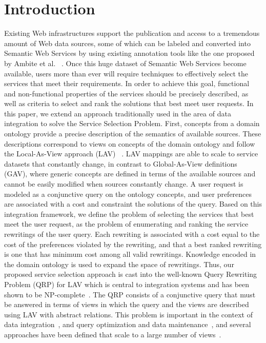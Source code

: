 \documentclass{llncs}
\begin{document}
\section{Introduction}
Existing Web infrastructures support the publication and access to a tremendous 
amount of Web data sources, some of which can be labeled and converted into 
Semantic Web Services by using existing annotation tools like the one proposed 
by Ambite et al. \ \cite{AmbiteISWC09}. Once this huge dataset of Semantic Web 
Services become available, users more than ever will require techniques to 
effectively select the services that meet their requirements. In order to achieve 
this goal, functional and non-functional properties of the services should be 
precisely described, as well as criteria to select and rank the solutions that best
 meet user requests.  
 In this paper, we extend an approach traditionally used in the area of data 
integration to solve the Service Selection Problem. First, concepts from a domain
ontology provide a precise description of the semantics of available sources. These 
descriptions correspond to views on concepts of the domain ontology and follow 
the Local-As-View approach (LAV)~\cite{levy:bucket} . LAV mappings are able to 
scale to service datasets that constantly change, in contrast to Global-As-View definitions 
(GAV), where generic concepts are defined in terms of the available sources and 
cannot be easily modified when sources constantly change. A user request is 
modeled as a conjunctive query on the ontology concepts, and user preferences 
are associated with a cost and constraint the solutions of the query. 
Based on this integration framework, we define the problem of selecting the 
services that best meet the user request, as the problem of enumerating and 
ranking the service rewritings of the user query. Each rewriting is associated 
with a cost equal to the cost of the preferences violated by the rewriting, and 
that a best ranked rewriting is one that has minimum cost among all valid 
rewritings. Knowledge encoded in the domain ontology is used to expand the 
space of rewritings. Thus, our proposed service selection approach is cast into 
the well-known Query Rewriting Problem (QRP) for LAV which is central to 
integration systems and has been shown to be NP-complete~\cite{Ullman00}. 
The QRP consists of a conjunctive query that must be answered in terms of views in 
which the query and the views are described using LAV with abstract relations. 
This problem is important in the context of data integration~\cite{Chen05,JaudoinPRST05}, 
and query optimization and data maintenance~\cite{AfratiLU07,levy:bucket}, and 
several approaches have been defined that scale to a large number of views~\cite{arvelo:aaai06,pods:DuschkaG97,sac:DuschkaG97,levy:bucket,pottinger:minicon}.
 
\end{document}
